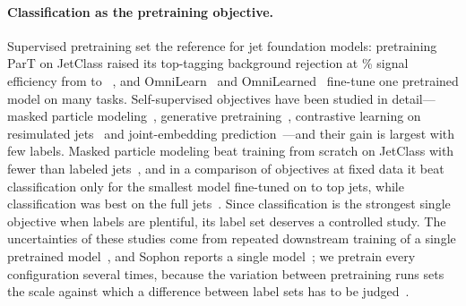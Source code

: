 \documentclass[11pt]{article}
\begin{document}
\paragraph{Classification as the pretraining objective.} Supervised pretraining set the reference
for jet foundation models: pretraining ParT on JetClass raised its top-tagging background rejection
at \LitPartTopSigEffPercent\% signal efficiency from \LitPartTopRejScratch{} to
\LitPartTopRejFt~\cite[Table~5]{part}, and OmniLearn~\cite{omnilearn} and
OmniLearned~\cite{omnilearned} fine-tune one pretrained model on many tasks. Self-supervised
objectives have been studied in detail---masked particle modeling~\cite{mpm,mpmtok}, generative
pretraining~\cite{omnijet}, contrastive learning on resimulated jets~\cite{rs3l} and
joint-embedding prediction~\cite{hepjepa,jpjepa}---and their gain is largest with few labels.
Masked particle modeling beat training from scratch on JetClass with fewer than
\LitMpmBenefitJets{} labeled jets~\cite{mpm}, and in a comparison of objectives at fixed data it
beat classification only for the smallest model fine-tuned on \LitObjectivesFewestJets{} to
\LitObjectivesFewJets{} top jets, while classification was best on the full
\LitObjectivesFullJets{} jets~\cite[Table~XVII]{objectives}. Since classification is the strongest
single objective when labels are plentiful, its label set deserves a controlled study. The
uncertainties of these studies come from repeated downstream training of a single pretrained
model~\cite{part,mpm}, and Sophon reports a single model~\cite{sophon}; we pretrain every
configuration several times, because the variation between pretraining runs sets the scale
against which a difference between label sets has to be judged~\cite{multiberts}.
\end{document}

